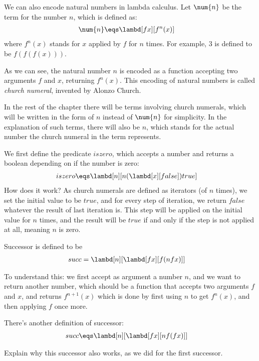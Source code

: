 \documentclass[../../../include/open-logic-section]{subfiles}
\begin{document}

We can also encode natural numbers in lambda calculus. Let
$\num{n}$ be the term for the number $n$, which is defined as:
\begin{align*}
  \num{n} &\eqs \lambd[fx][f^n(x)]
\end{align*}
where $f^n(x)$ stands for $x$ applied by $f$ for $n$ times. For
example, $\num{3}$ is defined to be $f(f(f(x)))$. 

As we can see, the natural number $n$ is encoded as a function
accepting two arguments $f$ and $x$, returning $f^n(x)$. This encoding
of natural numbers is called \emph{church numeral}, invented by Alonzo
Church.

In the rest of the chapter there will be terms involving church
numerals, which will be written in the form of $n$ instead of
$\num{n}$ for simplicity. In the explanation of such terms, there will
also be $n$, which stands for the actual number the church numeral in
the term represents.


We first define the predicate $iszero$, which accepts a number and
returns a boolean depending on if the number is zero:
\begin{align*}
  iszero &\eqs \lambd[n][n (\lambd[x][false]) true]
\end{align*}
How does it work? As church numerals are defined as iterators (of $n$
times), we set the initial value to be $true$, and for every step of
iteration, we return $false$ whatever the result of last iteration is.
This step will be applied on the initial value for $n$ times, and the
result will be $true$ if and only if the step is not applied at all,
meaning $n$ is zero.

Successor is defined to be
\begin{align*}
  {succ} &= \lambd[{n}][\lambd[fx][f ({n} f x)]]
\end{align*}

To understand this: we first accept as argument a number ${n}$, and we want to return another number,
which should be a function that accepts
two arguments $f$ and $x$, and returns $f^{n+1}(x)$
which is done by first using ${n}$ to get $f^n(x)$, and then applying $f$ once more.

There's another definition of successor:
\begin{align*}
  {succ} &\eqs \lambd[{n}][\lambd[fx][{n} f (f x)]]
\end{align*}

\begin{prob}
  Explain why this successor also works, as we did for the first successor.
\end{prob}
\end{document}
